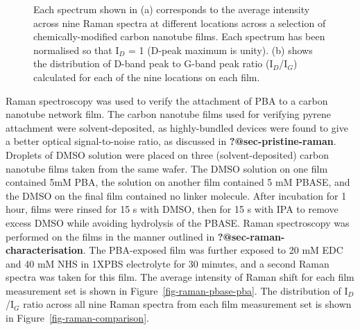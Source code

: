 \documentclass[
  a4paper,
]{scrbook}
\begin{document}
\begin{figure}
\begin{minipage}[t]{0.47\linewidth}
{{}

}

\subcaption{\label{fig-raman-comparison}}
\end{minipage}%

\caption{\label{fig-linker-raman}Each spectrum shown in (a) corresponds
to the average intensity across nine Raman spectra at different
locations across a selection of chemically-modified carbon nanotube
films. Each spectrum has been normalised so that I\(_D\) = 1 (D-peak
maximum is unity). (b) shows the distribution of D-band peak to G-band
peak ratio (I\(_D\)/I\(_G\)) calculated for each of the nine locations
on each film.}

\end{figure}

Raman spectroscopy was used to verify the attachment of PBA to a carbon
nanotube network film. The carbon nanotube films used for verifying
pyrene attachment were solvent-deposited, as highly-bundled devices were
found to give a better optical signal-to-noise ratio, as discussed in
\textbf{?@sec-pristine-raman}. Droplets of DMSO solution were placed on
three (solvent-deposited) carbon nanotube films taken from the same
wafer. The DMSO solution on one film contained 5mM PBA, the solution on
another film contained 5 mM PBASE, and the DMSO on the final film
contained no linker molecule. After incubation for 1 hour, films were
rinsed for 15 s with DMSO, then for 15 s with IPA to remove excess DMSO
while avoiding hydrolysis of the PBASE. Raman spectroscopy was performed
on the films in the manner outlined in
\textbf{?@sec-raman-characterisation}. The PBA-exposed film was further
exposed to 20 mM EDC and 40 mM NHS in 1XPBS electrolyte for 30 minutes,
and a second Raman spectra was taken for this film. The average
intensity of Raman shift for each film measurement set is shown in
Figure~\ref{fig-raman-pbase-pba}. The distribution of I\(_D\)/I\(_G\)
ratio across all nine Raman spectra from each film measurement set is
shown in Figure~\ref{fig-raman-comparison}.
\end{document}
